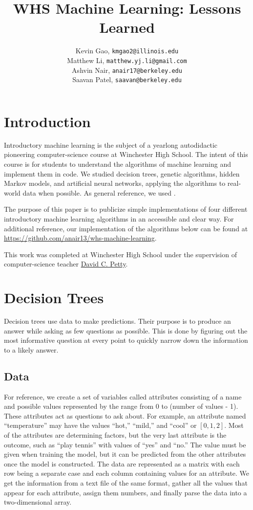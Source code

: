 \documentclass[11pt,a4paper]{article}
\author{Kevin Gao, \texttt{kmgao2@illinois.edu} \\
	Matthew Li, \texttt{matthew.yj.li@gmail.com} \\
	Ashvin Nair, \texttt{anair17@berkeley.edu} \\
	Saavan Patel, \texttt{saavan@berkeley.edu}}
\title{WHS Machine Learning: Lessons Learned}
\begin{document}
\maketitle

\section*{Introduction}
\label{Introduction}
Introductory machine learning is the subject of a yearlong autodidactic pioneering computer-science course at Winchester High School. The intent of this course is for students to understand the algorithms of machine learning and implement them in code. We studied decision trees, genetic algorithms, hidden Markov models, and artificial neural networks, applying the algorithms to real-world data when possible. As general reference, we used .

The purpose of this paper is to publicize simple implementations of four different introductory machine learning algorithms in an accessible and clear way. For additional reference, our implementation of the algorithms below can be found at \url{https://github.com/anair13/whs-machine-learning}.

This work was completed at Winchester High School under the supervision of computer-science teacher \href{http://winchester.k12.ma.us/~dpetty/}{David C. Petty}.

\section{Decision Trees}
\label{DecisionTrees}

Decision trees use data to make predictions. Their purpose is to produce an answer while asking as few questions as possible. This is done by figuring out the most informative question at every point to quickly narrow down the information to a likely answer.

\subsection{Data}
\label{DecisionTrees:Data}

For reference, we create a set of variables called attributes consisting of a name and possible values represented by the range from 0 to (number of values - 1). These attributes act as questions to ask about. For example, an attribute named ``temperature'' may have the values ``hot,'' ``mild,'' and ``cool'' or $[0, 1, 2]$. Most of the attributes are determining factors, but the very last attribute is the outcome, such as ``play tennis'' with values of ``yes'' and ``no.'' The value must be given when training the model, but it can be predicted from the other attributes once the model is constructed. The data are represented as a matrix with each row being a separate case and each column containing values for an attribute. We get the information from a text file of the same format, gather all the values that appear for each attribute, assign them numbers, and finally parse the data into a two-dimensional array.
\end{document}
